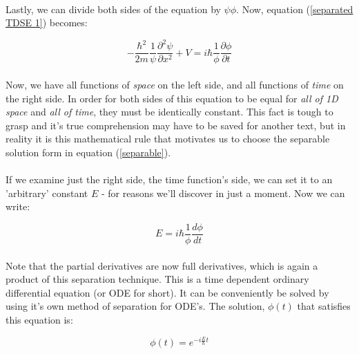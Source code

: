 \documentclass[12pt,letterpaper]{book}
\begin{document}
\paragraph*{}Lastly, we can divide both sides of the equation by $\psi \phi$. Now, equation (\ref{separated TDSE 1}) becomes:

\begin{equation}
\label{separated TDSE 2}
-\frac{\hbar^2}{2m}\frac{1}{\psi}\frac{\partial^2\psi}{\partial x^2} + V = 
i\hbar \frac{1}{\phi}\frac{\partial \phi}{\partial t}
\end{equation}

\paragraph*{}Now, we have all functions of \textit{space} on the left side, and all functions of \textit{time} on the right side. In order for both sides of this equation to be equal for \textit{all of 1D space} and \textit{all of time}, they must be identically constant. This fact is tough to grasp and it's true comprehension may have to be saved for another text, but in reality it is this mathematical rule that motivates us to choose the separable solution form in equation (\ref{separable}).

\paragraph*{}If we examine just the right side, the time function's side, we can set it to an 'arbitrary' constant $E$ - for reasons we'll discover in just a moment. Now we can write:

\begin{equation}
\label{energy ODE}
E = i\hbar \frac{1}{\phi}\frac{d\phi}{dt}
\end{equation}

\paragraph*{}Note that the partial derivatives are now full derivatives, which is again a product of this separation technique. This is a time dependent ordinary differential equation (or ODE for short). It can be conveniently be solved by using it's own method of separation for ODE's. The solution, $\phi(t)$ that satisfies this equation is:

\begin{equation}
\label{phi}
\phi(t) =  e^{-i\frac{E}{\hbar}t}
\end{equation}
\end{document}
